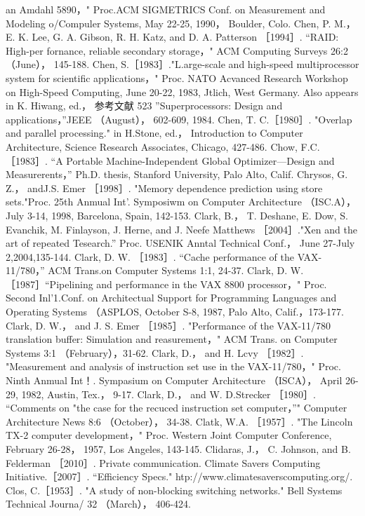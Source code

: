 an Amdahl 5890，" Proc.ACM SIGMETRICS Conf. on Measurement and Modeling o/Compuler Systems, May 22-25, 1990，
Boulder, Colo.
Chen, P. M.， E. K. Lee, G. A. Gibson, R. H. Katz, and D. A. Patterson ［1994］. “RAID: High-per fornance, reliable secondary
storage，" ACM Computing Surveys 26:2 （June）， 145-188.
Chen, S.［1983］."L.arge-scale and high-speed multiprocessor system for scientific applications，" Proc. NATO Acvanced Research
Workshop on High-Speed Computing, June 20-22, 1983, Jtlich, West Germany. Also appears in K. Hiwang, ed.，
参考文献
523
''Superprocessors: Design and applications，”JEEE （August）， 602-609, 1984.
Chen, T. C.［1980］. "Overlap and parallel processing." in H.Stone, ed.， Introduction to Computer Architecture, Science Research
Associates, Chicago, 427-486.
Chow, F.C. ［1983］. “A Portable Machine-Independent Global Optimizer—Design and Measurerents，” Ph.D. thesis, Stanford
University, Palo Alto, Calif.
Chrysos, G. Z.， andJ.S. Emer ［1998］. "Memory dependence prediction using store sets."Proc. 25th Anmual Int'. Symposiwm on
Computer Architecture （ISC.A）， July 3-14, 1998, Barcelona, Spain, 142-153.
Clark, B.， T. Deshane, E. Dow, S. Evanchik, M. Finlayson, J. Herne, and J. Neefe Matthews ［2004］."Xen and the art of repeated
Tesearch.” Proc. USENIK Anntal Technical Conf.， June 27-July 2,2004,135-144.
Clark, D. W. ［1983］. “Cache performance of the VAX-11/780，” ACM Trans.on Computer Systems 1:1, 24-37.
Clark, D. W. ［1987］“Pipelining and performance in the VAX 8800 processor，" Proc. Second Inl'1.Conf. on Architectual
Support for Programming Languages and Operating Systems （ASPLOS, October S-8, 1987, Palo Alto, Calif.，173-177.
Clark, D. W.， and J. S. Emer ［1985］. "Performance of the VAX-11/780 translation buffer: Simulation and reasurement，" ACM
Trans. on Computer Systems 3:1 （February），31-62.
Clark, D.， and H. Lcvy ［1982］. "Measurement and analysis of instruction set use in the VAX-11/780，" Proc. Ninth Anmual Int！.
Sympasium on Computer Architecture （ISCA）， April 26-29, 1982, Austin, Tex.， 9-17.
Clark, D.， and W. D.Strecker ［1980］. “Comments on "the case for the recuced instruction set computer，”" Computer Architecture
News 8:6 （October）， 34-38.
Clatk, W.A. ［1957］. "The Lincoln TX-2 computer development，" Proc. Western Joint Computer Conference, February 26-28，
1957, Los Angeles, 143-145.
Clidaras, J.， C. Johnson, and B. Felderman ［2010］. Private communication.
Climate Savers Computing Initiative.［2007］. “Efficiency Specs." htp://www.climatesaverscomputing.org/.
Clos, C.［1953］. "A study of non-blocking switching networks." Bell Systems Technical Journa/ 32 （March）， 406-424.
